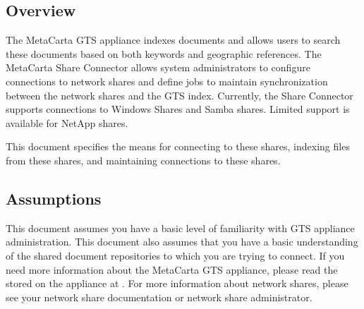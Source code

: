 %
%

\begin{changemargin}{1.5in}{0in}

\section{Overview}

The MetaCarta GTS appliance indexes documents and allows users to
search these documents based on both keywords and geographic
references. The MetaCarta Share Connector allows system administrators
to configure connections to network shares and define jobs to maintain
synchronization between the network shares and the GTS
index. Currently, the Share Connector supports connections to Windows Shares
and Samba shares. Limited support is available for NetApp shares.

This document specifies the means for connecting to these shares,
indexing files from these shares, and maintaining connections to
these shares.

\subsection{Assumptions}

This document assumes you have a basic level of familiarity with GTS
appliance administration. This document also assumes that you have a
basic understanding of the shared document repositories to which you
are trying to connect. If you need more information about the
MetaCarta GTS appliance, please read the  stored on the appliance at
. For more
information about network shares, please see your network share
documentation or network share administrator.


\end{changemargin}
